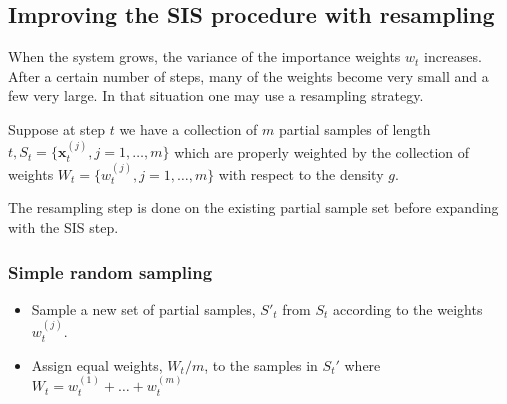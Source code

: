 \documentclass[times, utf8, diplomski]{fer}
\begin{document}

\subsection{Improving the SIS procedure with resampling}
When the system grows, the variance of the importance weights $w_t$ increases. After a certain number of steps, many of the weights become very small and a few very large. In that situation one may use a resampling strategy. 

Suppose at step $t$ we have a collection of $m$ partial samples of length $t, S_t = \{ \mathbf{x}_{t}^{(j)}, j = 1, \ldots, m \}$ which are properly weighted by the collection of weights $W_t = \{w_t^{(j)}, j = 1, \ldots, m\}$ with respect to the density $g$.

The resampling step is done on the existing partial sample set before expanding with the SIS step.

\subsubsection{Simple random sampling}
\begin{itemize}
\item{Sample a new set of partial samples, $S'_t$ from $S_t$ according to the weights $w_t^{(j)}$.}
\item{Assign equal weights, $W_t / m$, to the samples in $S_t'$ where $W_t = w_t^{(1)} + \ldots + w_t^{(m)}$}
\end{itemize}
\end{document}
